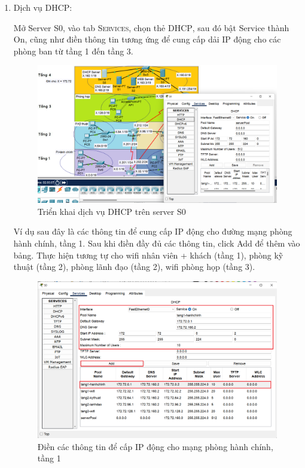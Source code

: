 \begin{enumerate}
\rm 
\begin{enumerate}
\item Dịch vụ DHCP:

Mở Server \textsc{S0}, vào tab \textsc{Services}, chọn thẻ \textsc{DHCP}, sau đó bật Service thành On, cũng như điền thông tin tương ứng để cung cấp dải IP động cho các phòng ban từ tầng 1 đến tầng 3.

\begin{figure}[H]
\begin{center}
\includegraphics[scale=.5]{../figures/p2/dhcp1}
\end{center}
\caption{Triển khai dịch vụ DHCP trên server S0}
\end{figure}

Ví dụ sau đây là các thông tin để cung cấp IP động cho đường mạng phòng hành chính, tầng 1. Sau khi điền đầy đủ các thông tin, click Add để thêm vào bảng. Thực hiện tương tự cho wifi nhân viên + khách (tầng 1), phòng kỹ thuật (tầng 2), phòng lãnh đạo (tầng 2), wifi phòng họp (tầng 3). 
\begin{figure}[H]
\begin{center}
\includegraphics[scale=.7]{../figures/p2/dhcp2}
\end{center}
\caption{Điền các thông tin để cấp IP động cho mạng phòng hành chính, tầng 1}
\end{figure}


\end{enumerate}
\end{enumerate}
